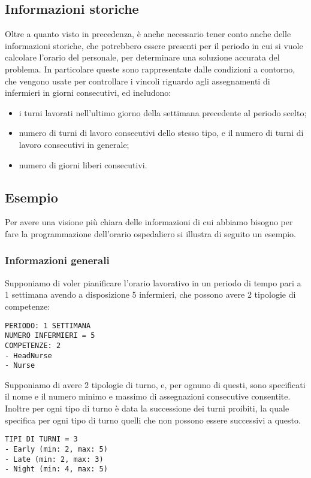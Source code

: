 \subsection{Informazioni storiche}
Oltre a quanto visto in precedenza, è anche necessario tener conto anche delle informazioni storiche, che potrebbero essere presenti per il periodo in cui si vuole calcolare l'orario del personale, per determinare una soluzione accurata del problema.
In particolare queste sono rappresentate dalle condizioni a contorno, che vengono usate per controllare i vincoli riguardo agli assegnamenti di infermieri in giorni consecutivi, ed includono:
\begin{itemize}
\item i turni lavorati nell'ultimo giorno della settimana precedente al periodo scelto;
\item numero di turni di lavoro consecutivi dello stesso tipo, e il numero di turni di lavoro consecutivi in generale;
\item numero di giorni liberi consecutivi.
\end{itemize}

\subsection{Esempio}
Per avere una visione più chiara delle informazioni di cui abbiamo bisogno per fare la programmazione dell'orario ospedaliero si illustra di seguito un esempio.

\subsubsection*{Informazioni generali}
Supponiamo di voler pianificare l'orario lavorativo in un periodo di tempo pari a 1 settimana avendo a disposizione 5 infermieri, che possono avere 2 tipologie di competenze:

\begin{verbatim}
PERIODO: 1 SETTIMANA
NUMERO INFERMIERI = 5
COMPETENZE: 2
- HeadNurse
- Nurse
\end{verbatim}

Supponiamo di avere 2 tipologie di turno, e, per ognuno di questi, sono specificati il nome e il numero minimo e massimo di assegnazioni consecutive consentite.
Inoltre per ogni tipo di turno è data la successione dei turni proibiti, la quale specifica per ogni tipo di turno quelli che non possono essere successivi a questo.

\begin{verbatim}
TIPI DI TURNI = 3
- Early (min: 2, max: 5)
- Late (min: 2, max: 3)
- Night (min: 4, max: 5)
\end{verbatim}

